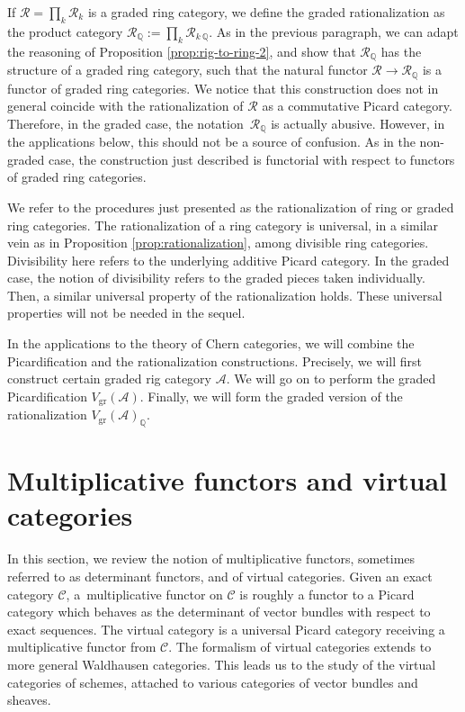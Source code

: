 \documentclass[JEP,XML,SOM,Unicode,published]{cedram}
\theoremstyle{plain}
\theoremstyle{definition}
\newcommand{\QBbb}{\mathbb Q}
\newcommand{\Acal}{\mathcal A}
\newcommand{\Ccal}{\mathcal C}
\newcommand{\Rcal}{\mathcal R}
\begin{document}
If $\Rcal=\prod_{k}\Rcal_{k}$ is a graded ring category, we define the graded rationalization as the product category $\Rcal_{\QBbb}:=\prod_{k}\Rcal_{k\ \QBbb}$. As in the previous paragraph, we can adapt the reasoning of Proposition \ref{prop:rig-to-ring-2}, and show that $\Rcal_{\QBbb}$ has the structure of a graded ring category, such that the natural functor $\Rcal\to\Rcal_{\QBbb}$ is a functor of graded ring categories. We notice that this construction does not in general coincide with the rationalization of $\Rcal$ as a commutative Picard category. Therefore, in the graded case, the notation~$\Rcal_{\QBbb}$ is actually abusive. However, in the applications below, this should not be a source of confusion. As in the non-graded case, the construction just described is functorial with respect to functors of graded ring categories.

We refer to the procedures just presented as the rationalization of ring or graded ring categories. The rationalization of a ring category is universal, in a similar vein as in Proposition \ref{prop:rationalization}, among divisible ring categories. Divisibility here refers to the underlying additive Picard category. In the graded case, the notion of divisibility refers to the graded pieces taken individually. Then, a similar universal property of the rationalization holds. These universal properties will not be needed in the sequel.

In the applications to the theory of Chern categories, we will combine the Picardification and the rationalization constructions. Precisely, we will first construct certain graded rig category $\Acal$. We will go on to perform the graded Picardification $V_{\mathrm{gr}}(\Acal)$. Finally, we will form the graded version of the rationalization $V_{\mathrm{gr}}(\Acal)_{\QBbb}$.

\section{Multiplicative functors and virtual categories}\label{sec:multiplicative-functors-virtual-categories}
In this section, we review the notion of multiplicative functors, sometimes referred to as determinant functors, and of virtual categories. Given an exact category $\Ccal$, a~multiplicative functor on $\Ccal$ is roughly a functor to a Picard category which behaves as the determinant of vector bundles with respect to exact sequences. The virtual category is a universal Picard category receiving a multiplicative functor from $\Ccal$. The formalism of virtual categories extends to more general Waldhausen categories. This leads us to the study of the virtual categories of schemes, attached to various categories of vector bundles and sheaves.
\end{document}
